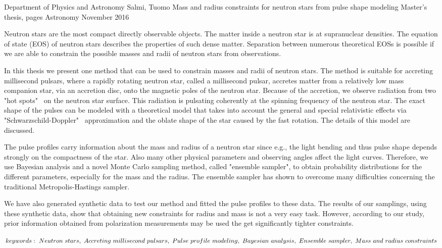 \documentclass{wihuri}
\begin{document}
\begin{tiivistelma}%
        {Department of Physics and Astronomy}%
        {Salmi, Tuomo}%
        {Mass and radius constraints for neutron stars
from pulse shape modeling}
        {Master's thesis, \pageref{LastPage} pages}%
        {Astronomy}%
        {November 2016}%

	Neutron stars are the most compact directly observable objects. The matter inside a neutron star is at supranuclear densities. The equation of state (EOS) of neutron stars describes the properties of such dense matter. Separation between numerous theoretical EOSs is possible if we are able to constrain the possible masses and radii of neutron stars from observations.
	
In this thesis we present one method that can be used to constrain masses and radii of neutron stars. The method is suitable for accreting millisecond pulsars, where a rapidly rotating neutron star, called a millisecond pulsar, accretes matter from a relatively low mass companion star, via an accretion disc, onto the magnetic poles of the neutron star. Because of the accretion, we observe radiation from two "hot spots" \ on the neutron star surface. This radiation is pulsating coherently at the spinning frequency of the neutron star. The exact shape of the pulses can be modeled with a  theoretical model that takes into account the general and special relativistic effects via "Schwarzschild-Doppler" \ approximation and the oblate shape of the star caused by the fast rotation. The details of this model are discussed. 
	
The pulse profiles carry information about the mass and radius of a neutron star since e.g., the light bending and thus pulse shape depends strongly on the compactness of the star. Also many other physical parameters and observing angles affect the light curves. Therefore, we use Bayesian analysis and a novel Monte Carlo sampling method, called "ensemble sampler", to obtain probability distributions for the different parameters, especially for the mass and the radius. The ensemble sampler has shown to overcome many difficulties concerning the traditional Metropolis-Hastings sampler. 

We have also generated synthetic data to test our method and fitted the pulse profiles to these data. The results of our samplings, using these synthetic data, show that obtaining new constraints for radius and mass is not a very easy task. However, according to our study, prior information obtained from polarization measurements may be used the get significantly tighter constraints.  

$keywords: ~Neutron ~stars, ~Accreting ~millisecond ~pulsars, ~Pulse ~profile ~modeling, \\ ~Bayesian ~analysis, ~Ensemble ~sampler, ~Mass ~and ~radius ~constraints$
	
	
\end{tiivistelma}
\end{document}
